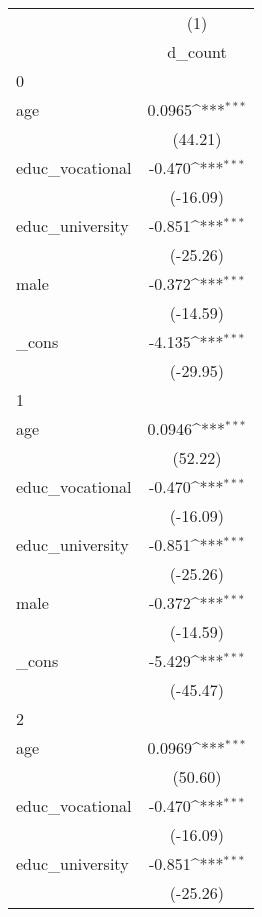 {
\def\sym#1{\ifmmode^{#1}\else\(^{#1}\)\fi}
\begin{tabular}{l*{1}{c}}
\hline\hline
            &\multicolumn{1}{c}{(1)}\\
            &\multicolumn{1}{c}{d\_count}\\
\hline
0           &                     \\
age         &      0.0965\sym{***}\\
            &     (44.21)         \\
[1em]
educ\_vocational&      -0.470\sym{***}\\
            &    (-16.09)         \\
[1em]
educ\_university&      -0.851\sym{***}\\
            &    (-25.26)         \\
[1em]
male        &      -0.372\sym{***}\\
            &    (-14.59)         \\
[1em]
\_cons      &      -4.135\sym{***}\\
            &    (-29.95)         \\
\hline
1           &                     \\
age         &      0.0946\sym{***}\\
            &     (52.22)         \\
[1em]
educ\_vocational&      -0.470\sym{***}\\
            &    (-16.09)         \\
[1em]
educ\_university&      -0.851\sym{***}\\
            &    (-25.26)         \\
[1em]
male        &      -0.372\sym{***}\\
            &    (-14.59)         \\
[1em]
\_cons      &      -5.429\sym{***}\\
            &    (-45.47)         \\
\hline
2           &                     \\
age         &      0.0969\sym{***}\\
            &     (50.60)         \\
[1em]
educ\_vocational&      -0.470\sym{***}\\
            &    (-16.09)         \\
[1em]
educ\_university&      -0.851\sym{***}\\
            &    (-25.26)         \\

\end{tabular}}
